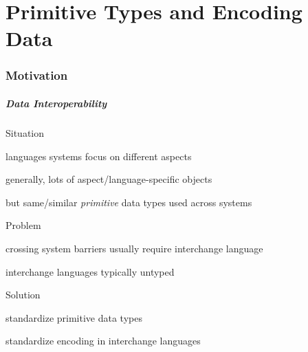 \part{Primitive Types and Encoding Data}

\section{Motivation}

\begin{frame}\frametitle{Data Interoperability}
\begin{blockitems}{Situation}
 \item languages systems focus on different aspects
 \item generally, lots of aspect/language-specific objects
 \item but same/similar \emph{primitive} data types used across systems
 \end{blockitems}
 
\begin{blockitems}{Problem}
 \item crossing system barriers usually require interchange language
 \item interchange languages typically untyped
\end{blockitems}

\begin{blockitems}{Solution}
 \item standardize primitive data types
 \item standardize encoding in interchange languages
\end{blockitems}
\end{frame}

